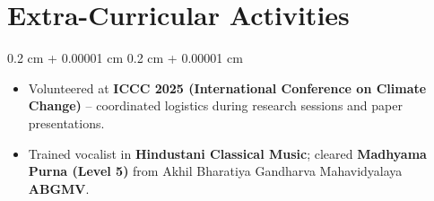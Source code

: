 \documentclass[10pt, a4]{article}
\newenvironment{highlightsforbulletentries}{
    \begin{itemize}[
        topsep=0.10 cm,
        parsep=0.10 cm,
        partopsep=0pt,
        itemsep=0pt,
        leftmargin=10pt
    ]
}{
    \end{itemize}
} %
\newenvironment{onecolentry}{
    \begin{adjustwidth}{
        0.2 cm + 0.00001 cm
    }{
        0.2 cm + 0.00001 cm
    }
}{
    \end{adjustwidth}
} %
\begin{document}
    \section{Extra-Curricular Activities}
        \begin{onecolentry}
            \begin{highlightsforbulletentries}
                \item Volunteered at \textbf{ICCC 2025 (International Conference on Climate Change)} – coordinated logistics during research sessions and paper presentations.
                \item Trained vocalist in \textbf{Hindustani Classical Music}; cleared \textbf{Madhyama Purna (Level 5)} from Akhil Bharatiya Gandharva Mahavidyalaya \textbf{ABGMV}.  
            \end{highlightsforbulletentries}
        \end{onecolentry}
\end{document}

